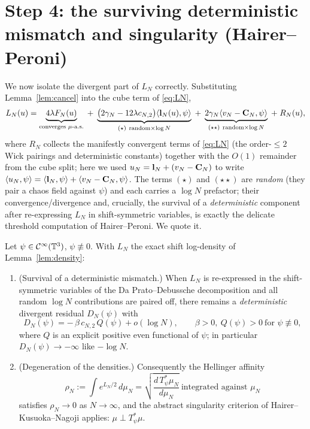 \section*{Step 4: the surviving deterministic mismatch and singularity (Hairer--Peroni)}

We now isolate the divergent part of $L_N$ correctly. Substituting Lemma~\ref{lem:cancel}
into the cube term of \eqref{eq:LN},
\begin{equation}\label{eq:LNsplit}
L_N(u)=\underbrace{4\lambda F_N(u)}_{\text{converges }\mu\text{-a.s.}}
\;+\;\underbrace{\bigl(2\gamma_N-12\lambda c_{N,2}\bigr)\langle\qoneLin_N(u),\psi\rangle}_{(\star)\ \text{random}\times\log N}
\;+\;\underbrace{2\gamma_N\langle v_N-\qoneIqc_N,\psi\rangle}_{(\star\star)\ \text{random}\times\log N}
\;+\;R_N(u),
\end{equation}
where $R_N$ collects the manifestly convergent terms of \eqref{eq:LN}
(the order-$\le2$ Wick pairings and deterministic constants) together with the
$O(1)$ remainder from the cube split; here we used
$u_N=\mathbf{l}_N+(v_N-\mathbf{C}_N)$ to write $\langle u_N,\psi\rangle=
\langle\mathbf{l}_N,\psi\rangle+\langle v_N-\mathbf{C}_N,\psi\rangle$. The terms $(\star)$
and $(\star\star)$ are \emph{random} (they pair a chaos field against $\psi$) and each
carries a $\log N$ prefactor; their convergence/divergence and, crucially, the survival
of a \emph{deterministic} component after re-expressing $L_N$ in shift-symmetric
variables, is exactly the delicate threshold computation of Hairer--Peroni. We quote it.

\begin{qonetheorem}[Hairer--Peroni \cite{HP25}; singularity in $d=3$]\label{thm:HP}
Let $\psi\in\mathcal{C}^\infty(\mathbb{T}^3)$, $\psi\not\equiv0$. With $L_N$ the exact shift
log-density of Lemma~\ref{lem:density}:
\begin{enumerate}
\item[(i)] (Survival of a deterministic mismatch.) When $L_N$ is re-expressed in the
shift-symmetric variables of the Da Prato--Debussche decomposition and all random
$\log N$ contributions are paired off, there remains a \emph{deterministic} divergent
residual $D_N(\psi)$ with
\[
D_N(\psi)=-\,\beta\,c_{N,2}\,Q(\psi)+o(\log N),\qquad \beta>0,\ Q(\psi)>0\ \text{for }\psi\not\equiv0,
\]
where $Q$ is an explicit positive even functional of $\psi$; in particular
$D_N(\psi)\to-\infty$ like $-\log N$.
\item[(ii)] (Degeneration of the densities.) Consequently the Hellinger affinity
\[
\rho_N:=\int e^{L_N/2}\,d\mu_N=\sqrt{\frac{d\,T_\psi^*\mu_N}{d\mu_N}}\ \text{integrated against }\mu_N
\]
satisfies $\rho_N\to0$ as $N\to\infty$, and the abstract singularity criterion of
Hairer--Kusuoka--Nagoji \cite{HKN24} applies: $\mu\perp T_\psi^*\mu$.
\end{enumerate}
\end{qonetheorem}

